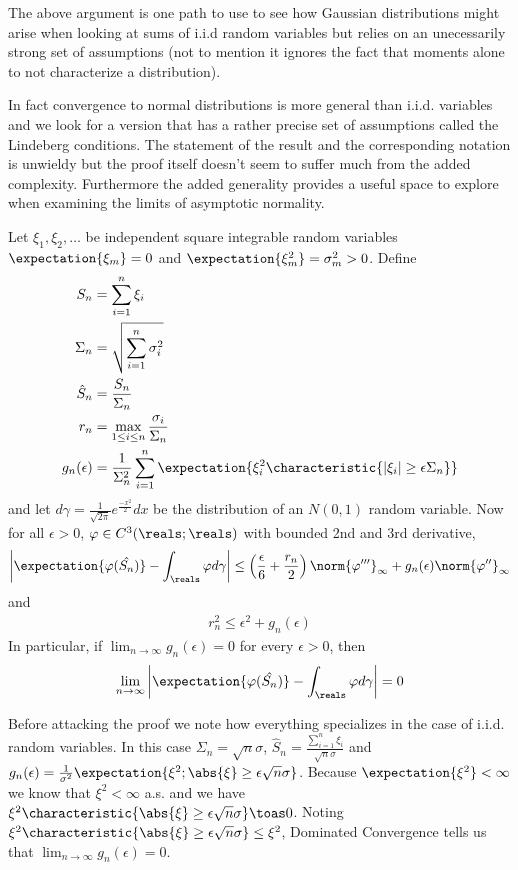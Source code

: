 The above argument is one path to use to see how Gaussian
distributions might arise when looking at sums of i.i.d random
variables but relies on an unecessarily strong set of assumptions (not
to mention it ignores the fact that moments alone to not characterize
a distribution).

In fact convergence to normal distributions is more general than
i.i.d. variables and we look for a version that has a rather precise set of
assumptions called the Lindeberg conditions.  The statement of the
result and the corresponding notation is unwieldy but the proof itself
doesn't seem to suffer much from the added complexity.  Furthermore
the added generality provides a useful space to explore when examining the limits of asymptotic normality.

\begin{thm}[Lindeberg]\label{LindebergTheorem}Let $\xi_1, \xi_2, \dots$ be independent square
  integrable random variables $\expectation{\xi_m} = 0$ and
  $\expectation{\xi_m^2} = \sigma_m^2 > 0$.  Define
\begin{align*}
S_n &= \sum_{i=1}^n \xi_i \\
\Sigma_n &= \sqrt{\sum_{i=1}^n \sigma_i^2}\\
\hat{S}_n &= \frac{S_n}{\Sigma_n} \\
r_n &= \max_{1 \leq i \leq n} \frac{\sigma_i}{\Sigma_n} \\
g_n(\epsilon) &= \frac{1}{\Sigma_n^2} \sum_{i=1}^n \expectation{\xi_i^2
  \characteristic{|\xi_i| \geq \epsilon \Sigma_n}}
\end{align*}
and let $d \gamma = \frac{1}{\sqrt{2\pi}} e^{\frac{-x^2}{2}} dx$ be the
  distribution of an $N(0,1)$ random variable.  Now for all $\epsilon > 0$, $\varphi \in C^3(\reals;\reals)$ with
bounded 2nd and 3rd derivative,
\begin{align*}
\left \lvert \expectation{\varphi(\hat{S_n})} - \int_\reals \varphi
  d\gamma \right \rvert \leq
\left ( \frac{\epsilon}{6} + \frac{r_n}{2}\right ) \norm{\varphi^{\prime\prime\prime}}_\infty + g_n(\epsilon) \norm{\varphi^{ \prime
\prime}}_\infty
\end{align*}
and 
\begin{align*}
r_n^2 \leq \epsilon^2 + g_n(\epsilon)
\end{align*}
In particular, if $\lim_{n \to \infty} g_n(\epsilon) = 0$ for every
$\epsilon > 0$, then 
\begin{align*}
\lim_{n \to \infty} \left \lvert \expectation{\varphi(\hat{S_n})} - \int_\reals \varphi
  d\gamma \right \rvert = 0
\end{align*}
\end{thm}
Before attacking the proof we note how everything specializes in the
case of i.i.d. random variables.  In this case $\Sigma_n = \sqrt{n}
\sigma$, $\hat{S}_n = \frac{\sum_{i=1}^n \xi_i}{\sqrt{n} \sigma}$ and
$g_n(\epsilon) = \frac{1}{\sigma^2} \expectation{\xi^2 ; \abs{\xi}
  \geq \epsilon \sqrt{n} \sigma}$.  Because $\expectation{\xi^2}
< \infty$ we know that $\xi^2 < \infty$ a.s.  and we have
$\xi^2 \characteristic{\abs{\xi}  \geq \epsilon \sqrt{n} \sigma}
\toas 0$.  Noting $\xi^2 \characteristic{\abs{\xi}  \geq \epsilon \sqrt{n}
  \sigma} \leq \xi^2$, Dominated Convergence tells us that $\lim_{n
\to \infty} g_n(\epsilon) = 0$.

